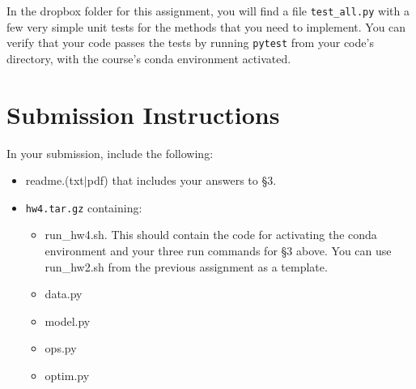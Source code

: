 \documentclass[11pt]{article}
\begin{document}
In the dropbox folder for this assignment, you will find a file \texttt{test\_all.py} with a few very simple unit tests for the methods that you need to implement. You can verify that your code passes the tests by running \texttt{pytest} from your code's directory, with the course's conda environment activated.


\section*{Submission Instructions}

In your submission, include the following:
\begin{itemize}
  \item readme.(txt$\mid$pdf) that includes your answers to \S3. 
  \item \texttt{hw4.tar.gz} containing:
  \begin{itemize}
    \item run\_hw4.sh.  This should contain the code for activating the conda environment and your three run commands for \S3 above.  You can use run\_hw2.sh from the previous assignment as a template.
    \item data.py
    \item model.py
    \item ops.py
    \item optim.py
  \end{itemize}
\end{itemize}
\end{document}
